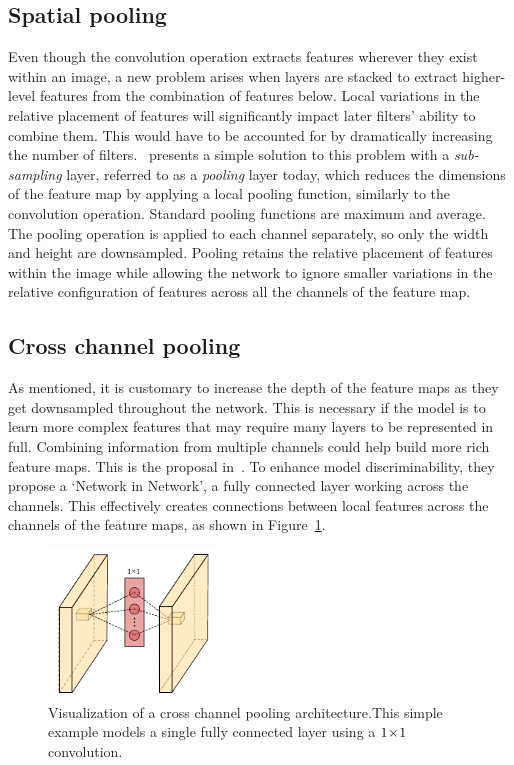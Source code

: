 \subsection{Spatial pooling}
Even though the convolution operation extracts features wherever they exist within an image, a new problem arises when layers are stacked to extract higher-level features from the combination of features below.
Local variations in the relative placement of features will significantly impact later filters' ability to combine them. This would have to be accounted for by dramatically increasing the number of filters.\ \textcite{lecun1998gradient} presents a simple solution to this problem with a \textit{sub-sampling} layer, referred to as a \textit{pooling} layer today, which reduces the dimensions of the feature map by applying a local pooling function, similarly to the convolution operation.
Standard pooling functions are maximum and average.
The pooling operation is applied to each channel separately, so only the width and height are downsampled.
Pooling retains the relative placement of features within the image while allowing the network to ignore smaller variations in the relative configuration of features across all the channels of the feature map.

\subsection{Cross channel pooling}
As mentioned, it is customary to increase the depth of the feature maps as they get downsampled throughout the network.
This is necessary if the model is to learn more complex features that may require many layers to be represented in full.
Combining information from multiple channels could help build more rich feature maps.
This is the proposal in\ \textcite{lin2014network}.
To enhance model discriminability, they propose a `Network in Network', a fully connected layer working across the channels.
This effectively creates connections between local features across the channels of the feature maps, as shown in Figure~\ref{fig:back-cross-channel}.

\begin{figure}[htbp]
  \centering
  \includegraphics[width=0.4\textwidth]{figs/background/cross-channel.pdf}
  \caption[Cross channel pooling architecture]{Visualization of a cross channel pooling architecture.This simple example models a single fully connected layer using a \(1\!\times \! 1\) convolution.}\label{fig:back-cross-channel}
\end{figure}

